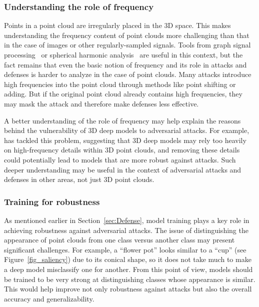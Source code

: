 \documentclass{ieeeaccess}
\begin{document}
\subsubsection{Understanding the role of frequency} 

Points in a point cloud are irregularly placed in the 3D space. This makes understanding the frequency content of point clouds more challenging than that in the case of images or other regularly-sampled signals. Tools from graph signal processing~\cite{GSP2013SPM} or spherical harmonic analysis~\cite{cohen2018spherical} are useful in this context, but the fact remains that even the basic notion of frequency and its role in attacks and defenses is harder to analyze in the case of point clouds.
Many attacks introduce high frequencies into the point cloud through methods like point shifting or adding. But if the original point cloud already contains high frequencies, they may mask the attack and therefore make defenses less effective.

A better understanding of the role of frequency may help explain the reasons behind the vulnerability of 3D deep models to adversarial attacks. %
For example,~\cite{naderi2023lpf} has tackled this problem, suggesting that 3D deep models may rely too heavily on high-frequency details within 3D point clouds, and removing these details could potentially lead to models that are more robust against attacks. Such deeper understanding may be useful in the context of adversarial attacks and defenses in other areas, not just 3D point clouds. %




\subsubsection{Training for robustness}

As mentioned earlier in Section~\ref{sec:Defense}, model training plays a key role in achieving robustness against adversarial attacks. %
The issue of distinguishing the appearance of point clouds from one class versus another class may present significant challenges. For example, a ``flower pot'' looks similar to a ``cup'' (see Figure~\ref{fig_saliency}) due to its conical shape, so it does not take much to make a deep model misclassify one for another. From this point of view, models should be trained to be very strong at distinguishing classes whose appearance is similar. This would help improve not only robustness against attacks but also the overall accuracy and generalizability.
\end{document}
